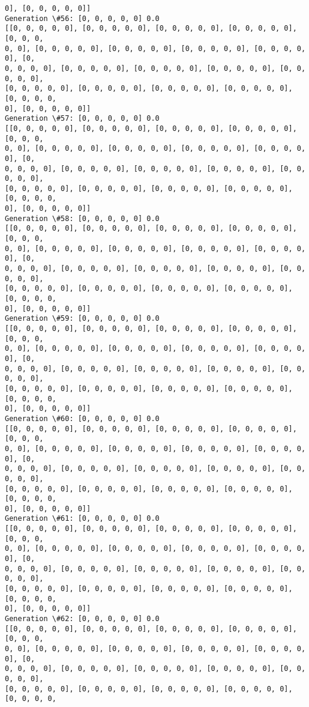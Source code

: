 \documentclass[11pt]{article}
\begin{document}
\begin{Verbatim}[commandchars=\\\{\}]
0], [0, 0, 0, 0, 0]]
Generation \#56: [0, 0, 0, 0, 0] 0.0
[[0, 0, 0, 0, 0], [0, 0, 0, 0, 0], [0, 0, 0, 0, 0], [0, 0, 0, 0, 0], [0, 0, 0,
0, 0], [0, 0, 0, 0, 0], [0, 0, 0, 0, 0], [0, 0, 0, 0, 0], [0, 0, 0, 0, 0], [0,
0, 0, 0, 0], [0, 0, 0, 0, 0], [0, 0, 0, 0, 0], [0, 0, 0, 0, 0], [0, 0, 0, 0, 0],
[0, 0, 0, 0, 0], [0, 0, 0, 0, 0], [0, 0, 0, 0, 0], [0, 0, 0, 0, 0], [0, 0, 0, 0,
0], [0, 0, 0, 0, 0]]
Generation \#57: [0, 0, 0, 0, 0] 0.0
[[0, 0, 0, 0, 0], [0, 0, 0, 0, 0], [0, 0, 0, 0, 0], [0, 0, 0, 0, 0], [0, 0, 0,
0, 0], [0, 0, 0, 0, 0], [0, 0, 0, 0, 0], [0, 0, 0, 0, 0], [0, 0, 0, 0, 0], [0,
0, 0, 0, 0], [0, 0, 0, 0, 0], [0, 0, 0, 0, 0], [0, 0, 0, 0, 0], [0, 0, 0, 0, 0],
[0, 0, 0, 0, 0], [0, 0, 0, 0, 0], [0, 0, 0, 0, 0], [0, 0, 0, 0, 0], [0, 0, 0, 0,
0], [0, 0, 0, 0, 0]]
Generation \#58: [0, 0, 0, 0, 0] 0.0
[[0, 0, 0, 0, 0], [0, 0, 0, 0, 0], [0, 0, 0, 0, 0], [0, 0, 0, 0, 0], [0, 0, 0,
0, 0], [0, 0, 0, 0, 0], [0, 0, 0, 0, 0], [0, 0, 0, 0, 0], [0, 0, 0, 0, 0], [0,
0, 0, 0, 0], [0, 0, 0, 0, 0], [0, 0, 0, 0, 0], [0, 0, 0, 0, 0], [0, 0, 0, 0, 0],
[0, 0, 0, 0, 0], [0, 0, 0, 0, 0], [0, 0, 0, 0, 0], [0, 0, 0, 0, 0], [0, 0, 0, 0,
0], [0, 0, 0, 0, 0]]
Generation \#59: [0, 0, 0, 0, 0] 0.0
[[0, 0, 0, 0, 0], [0, 0, 0, 0, 0], [0, 0, 0, 0, 0], [0, 0, 0, 0, 0], [0, 0, 0,
0, 0], [0, 0, 0, 0, 0], [0, 0, 0, 0, 0], [0, 0, 0, 0, 0], [0, 0, 0, 0, 0], [0,
0, 0, 0, 0], [0, 0, 0, 0, 0], [0, 0, 0, 0, 0], [0, 0, 0, 0, 0], [0, 0, 0, 0, 0],
[0, 0, 0, 0, 0], [0, 0, 0, 0, 0], [0, 0, 0, 0, 0], [0, 0, 0, 0, 0], [0, 0, 0, 0,
0], [0, 0, 0, 0, 0]]
Generation \#60: [0, 0, 0, 0, 0] 0.0
[[0, 0, 0, 0, 0], [0, 0, 0, 0, 0], [0, 0, 0, 0, 0], [0, 0, 0, 0, 0], [0, 0, 0,
0, 0], [0, 0, 0, 0, 0], [0, 0, 0, 0, 0], [0, 0, 0, 0, 0], [0, 0, 0, 0, 0], [0,
0, 0, 0, 0], [0, 0, 0, 0, 0], [0, 0, 0, 0, 0], [0, 0, 0, 0, 0], [0, 0, 0, 0, 0],
[0, 0, 0, 0, 0], [0, 0, 0, 0, 0], [0, 0, 0, 0, 0], [0, 0, 0, 0, 0], [0, 0, 0, 0,
0], [0, 0, 0, 0, 0]]
Generation \#61: [0, 0, 0, 0, 0] 0.0
[[0, 0, 0, 0, 0], [0, 0, 0, 0, 0], [0, 0, 0, 0, 0], [0, 0, 0, 0, 0], [0, 0, 0,
0, 0], [0, 0, 0, 0, 0], [0, 0, 0, 0, 0], [0, 0, 0, 0, 0], [0, 0, 0, 0, 0], [0,
0, 0, 0, 0], [0, 0, 0, 0, 0], [0, 0, 0, 0, 0], [0, 0, 0, 0, 0], [0, 0, 0, 0, 0],
[0, 0, 0, 0, 0], [0, 0, 0, 0, 0], [0, 0, 0, 0, 0], [0, 0, 0, 0, 0], [0, 0, 0, 0,
0], [0, 0, 0, 0, 0]]
Generation \#62: [0, 0, 0, 0, 0] 0.0
[[0, 0, 0, 0, 0], [0, 0, 0, 0, 0], [0, 0, 0, 0, 0], [0, 0, 0, 0, 0], [0, 0, 0,
0, 0], [0, 0, 0, 0, 0], [0, 0, 0, 0, 0], [0, 0, 0, 0, 0], [0, 0, 0, 0, 0], [0,
0, 0, 0, 0], [0, 0, 0, 0, 0], [0, 0, 0, 0, 0], [0, 0, 0, 0, 0], [0, 0, 0, 0, 0],
[0, 0, 0, 0, 0], [0, 0, 0, 0, 0], [0, 0, 0, 0, 0], [0, 0, 0, 0, 0], [0, 0, 0, 0,

\end{Verbatim}
\end{document}
